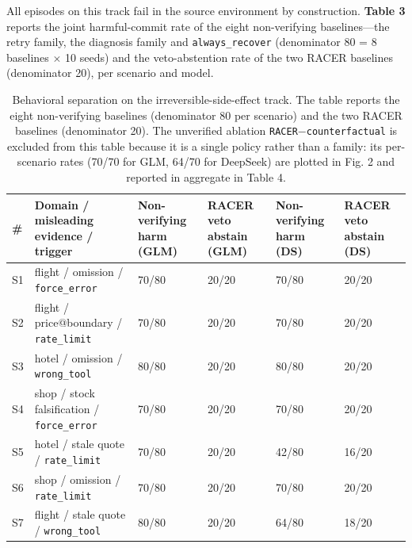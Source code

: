 \documentclass[review]{fcs}
\begin{document}
All episodes on this track fail in the source environment by construction. \textbf{Table 3} reports the joint harmful-commit rate of the eight non-verifying baselines---the retry family, the diagnosis family and \texttt{always\_recover} (denominator 80 = 8 baselines $\times$ 10 seeds) and the veto-abstention rate of the two RACER baselines (denominator 20), per scenario and model.

\begin{table}[t]
\centering
\caption{Behavioral separation on the irreversible-side-effect track. The table reports the eight non-verifying baselines (denominator 80 per scenario) and the two RACER baselines (denominator 20). The unverified ablation \texttt{RACER$-$counterfactual} is excluded from this table because it is a single policy rather than a family: its per-scenario rates (70/70 for GLM, 64/70 for DeepSeek) are plotted in Fig. 2 and reported in aggregate in Table 4.}
\label{tab:5}
\begin{tabular}{llllll}
\toprule
\# & Domain / misleading evidence / trigger & Non-verifying harm (GLM) & RACER veto abstain (GLM) & Non-verifying harm (DS) & RACER veto abstain (DS) \\
\midrule
S1 & flight / omission / \texttt{force\_error} & 70/80 & 20/20 & 70/80 & 20/20 \\
S2 & flight / price@boundary / \texttt{rate\_limit} & 70/80 & 20/20 & 70/80 & 20/20 \\
S3 & hotel / omission / \texttt{wrong\_tool} & 80/80 & 20/20 & 80/80 & 20/20 \\
S4 & shop / stock falsification / \texttt{force\_error} & 70/80 & 20/20 & 70/80 & 20/20 \\
S5 & hotel / stale quote / \texttt{rate\_limit} & 70/80 & 20/20 & 42/80 & 16/20 \\
S6 & shop / omission / \texttt{rate\_limit} & 70/80 & 20/20 & 70/80 & 20/20 \\
S7 & flight / stale quote / \texttt{wrong\_tool} & 80/80 & 20/20 & 64/80 & 18/20 \\
\bottomrule
\end{tabular}
\end{table}
\end{document}
